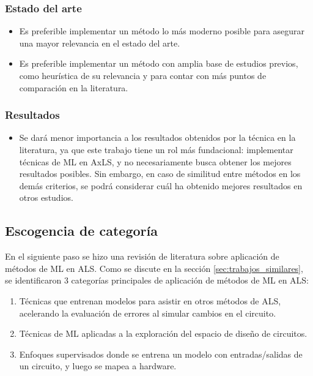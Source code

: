 \subsubsection{Estado del arte}
\begin{itemize}
    \item Es preferible implementar un método lo más moderno posible para
      asegurar una mayor relevancia en el estado del arte.

    \item Es preferible implementar un método con amplia base de estudios
      previos, como heurística de su relevancia y para contar con más puntos de
      comparación en la literatura.
\end{itemize}

\subsubsection{Resultados}
\begin{itemize}
    \item Se dará menor importancia a los resultados obtenidos por la técnica
      en la literatura, ya que este trabajo tiene un rol más fundacional:
      implementar técnicas de ML en AxLS, y no necesariamente busca obtener los
      mejores resultados posibles. Sin embargo, en caso de similitud entre
      métodos en los demás criterios, se podrá considerar cuál ha obtenido
      mejores resultados en otros estudios.
\end{itemize}

\subsection{Escogencia de categoría}

En el siguiente paso se hizo una revisión de literatura sobre aplicación de
métodos de ML en ALS.
Como se discute en la sección \ref{sec:trabajos_similares}, se identificaron 3
categorías principales de aplicación de métodos de ML en ALS:

\begin{enumerate}
    \item Técnicas que entrenan modelos para asistir en otros métodos de ALS,
      acelerando la evaluación de errores al simular cambios en el circuito.
    \item Técnicas de ML aplicadas a la exploración del espacio de diseño de
      circuitos.
    \item Enfoques supervisados donde se entrena un modelo con entradas/salidas
      de un circuito, y luego se mapea a hardware.
\end{enumerate}

